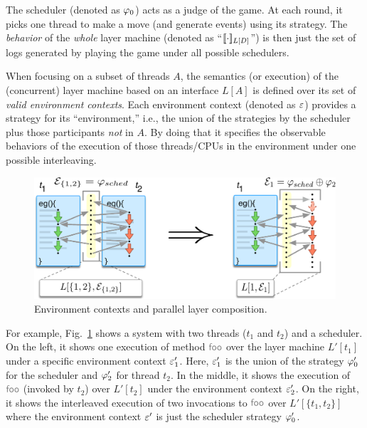 The scheduler (denoted as $\varphi_{0}$) acts as a judge of the game.
At each round, it picks one thread to make a move (and generate events) using its strategy. The \emph{behavior} of the \emph{whole} layer machine (denoted as ``$[\![\cdot]\!]_{L[D]}$'') is then just the set of  logs generated by playing the game under all possible schedulers.

When focusing on a subset of threads $A$, the semantics (or execution) of the (concurrent) layer machine based on an
interface $L[A]$ is defined over its set of \emph{valid environment
contexts}. Each environment context (denoted as $\oracle$) provides a
strategy for its ``environment,'' i.e., the union of the strategies
by the scheduler plus those participants {\em not} in $A$.
By doing that it specifies the observable behaviors of the
execution of those threads/CPUs in the environment under one possible
interleaving.

\begin{figure}[t]
\centering
\includegraphics[scale=.38]{figs/ccal/pcomp}
\caption{Environment contexts and parallel layer composition.}
\label{fig:pcomp}
\end{figure}

For example, Fig.~\ref{fig:pcomp} shows a system with two threads
($t_1$ and $t_2$) and a scheduler. On the left, it shows one execution
of method $\commc{foo}$ over the layer machine $L'[t_1]$ under a specific
environment context $\oracle'_1$.  Here, $\oracle'_1$ is the union of
the strategy $\varphi'_{0}$ for the scheduler and $\varphi'_{2}$ for
thread $t_2$. In the middle, it shows the execution of $\commc{foo}$
(invoked by $t_2$) over $L'[t_2]$ under the environment context
$\oracle'_2$. On the right, it shows the interleaved execution of
two invocations to $\commc{foo}$ over $L'[\{t_1,t_2\}]$
where the environment context $\oracle'$ is just the scheduler
strategy $\varphi'_{0}$.

